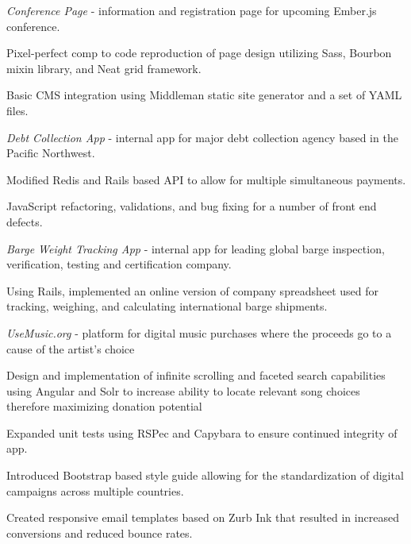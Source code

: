 \documentclass[]{deedy-resume}
\begin{document}
\begin{minipage}[t]{0.66\textwidth}
\textit{Conference Page} - information and registration page for upcoming Ember.js conference.
\begin{tightemize}
\item Pixel-perfect comp to code reproduction of page design utilizing Sass, Bourbon mixin library, and Neat grid framework.
\item Basic CMS integration using Middleman static site generator and a set of YAML files.
\end{tightemize}
\textit{Debt Collection App} - internal app for major debt collection agency based in the Pacific Northwest.
\begin{tightemize}
\item Modified Redis and Rails based API to allow for multiple simultaneous payments.
\item JavaScript refactoring, validations, and bug fixing for a number of front end defects.
\end{tightemize}
\textit{Barge Weight Tracking App} - internal app for leading global barge inspection, verification, testing and certification company.
\begin{tightemize}
\item Using Rails, implemented an online version of company spreadsheet used for tracking, weighing, and calculating international barge shipments.
\end{tightemize}
\textit{UseMusic.org} - platform for digital music purchases where the proceeds go to a cause of the artist’s choice
\begin{tightemize}
\item Design and implementation of infinite scrolling and faceted search capabilities using Angular and Solr to increase ability to locate relevant song choices therefore maximizing donation potential
\item Expanded unit tests using RSPec and Capybara to ensure continued integrity of app.
\end{tightemize}
\sectionsep

\begin{tightemize}
\item Introduced Bootstrap based style guide allowing for the standardization of digital campaigns across multiple countries.
\item Created responsive email templates based on Zurb Ink that resulted in increased conversions and reduced bounce rates.
\end{tightemize}
\sectionsep


\end{minipage}
\end{document}
